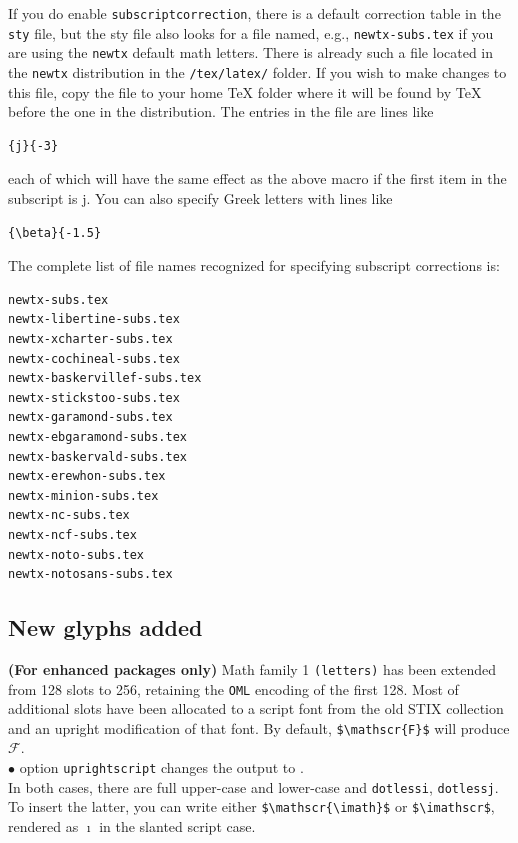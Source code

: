 \documentclass[11pt]{article}
\theoremstyle{oldplain}
\theoremstyle{plain}
\begin{document}
If you do enable {\tt subscriptcorrection}, there is a default correction table in the {\tt sty} file, but the sty file also looks for a file named, e.g., {\tt newtx-subs.tex} if you are using the {\tt newtx} default math letters. There is already such a file located in the {\tt newtx} distribution in the \verb|/tex/latex/| folder. If you wish to make changes to this file, copy the file to your home TeX folder where it will be found by TeX before the one in the distribution. The entries in the file are lines like
\begin{verbatim}
{j}{-3}
\end{verbatim}
each of which will have the same effect as the above macro if the first item in the subscript is j. You can also specify Greek letters with lines like
\begin{verbatim}
{\beta}{-1.5}
\end{verbatim}
The complete list of file names recognized for specifying subscript corrections is:
\begin{verbatim}
newtx-subs.tex
newtx-libertine-subs.tex
newtx-xcharter-subs.tex
newtx-cochineal-subs.tex
newtx-baskervillef-subs.tex
newtx-stickstoo-subs.tex
newtx-garamond-subs.tex
newtx-ebgaramond-subs.tex
newtx-baskervald-subs.tex
newtx-erewhon-subs.tex
newtx-minion-subs.tex
newtx-nc-subs.tex
newtx-ncf-subs.tex
newtx-noto-subs.tex
newtx-notosans-subs.tex
\end{verbatim}

\subsection{New glyphs added} \textbf{(For enhanced packages only)} Math family 1 {\tt (letters)} has been extended from 128 slots to 256, retaining the {\tt OML} encoding of the first 128. Most of additional slots have been allocated to a script font from the old STIX collection and an upright modification of that font.
By default, \verb|$\mathscr{F}$| will produce $\mathscr{F}$.\\
$\bullet$ option {\tt uprightscript} changes the output to {}.\\
In both cases, there are full upper-case and lower-case and {\tt dotlessi}, {\tt dotlessj}. To insert the latter, you can write either \verb|$\mathscr{\imath}$| or \verb|$\imathscr$|, rendered as $\mathscr{\imath}$ in the slanted script case.
\end{document}
